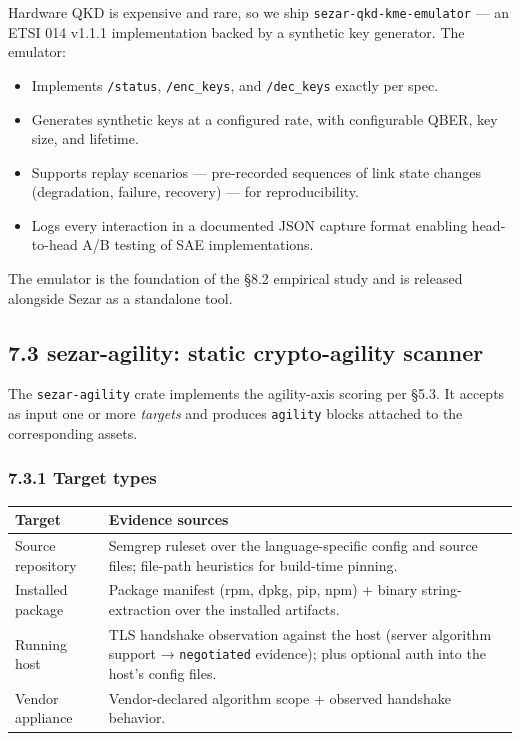Hardware QKD is expensive and rare, so we ship
\texttt{sezar-qkd-kme-emulator} --- an ETSI 014 v1.1.1 implementation
backed by a synthetic key generator. The emulator:

\begin{itemize}
\tightlist
\item
  Implements \texttt{/status}, \texttt{/enc\_keys}, and
  \texttt{/dec\_keys} exactly per spec.
\item
  Generates synthetic keys at a configured rate, with configurable QBER,
  key size, and lifetime.
\item
  Supports replay scenarios --- pre-recorded sequences of link state
  changes (degradation, failure, recovery) --- for reproducibility.
\item
  Logs every interaction in a documented JSON capture format enabling
  head-to-head A/B testing of SAE implementations.
\end{itemize}

The emulator is the foundation of the §8.2 empirical study and is
released alongside Sezar as a standalone tool.

\subsection{7.3 sezar-agility: static crypto-agility
scanner}\label{sezar-agility-static-crypto-agility-scanner}

The \texttt{sezar-agility} crate implements the agility-axis scoring per
§5.3. It accepts as input one or more \emph{targets} and produces
\texttt{agility} blocks attached to the corresponding assets.

\subsubsection{7.3.1 Target types}\label{target-types}

\begin{longtable}[]{@{}
  >{\raggedright\arraybackslash}p{}
  >{\raggedright\arraybackslash}p{}@{}}
\toprule\noalign{}
\begin{minipage}[b]{\linewidth}\raggedright
Target
\end{minipage} & \begin{minipage}[b]{\linewidth}\raggedright
Evidence sources
\end{minipage} \\
\midrule\noalign{}
\endhead
\bottomrule\noalign{}
\endlastfoot
Source repository & Semgrep ruleset over the language-specific config
and source files; file-path heuristics for build-time pinning. \\
Installed package & Package manifest (rpm, dpkg, pip, npm) + binary
string-extraction over the installed artifacts. \\
Running host & TLS handshake observation against the host (server
algorithm support → \texttt{negotiated} evidence); plus optional auth
into the host's config files. \\
Vendor appliance & Vendor-declared algorithm scope + observed handshake
behavior. \\
\end{longtable}

